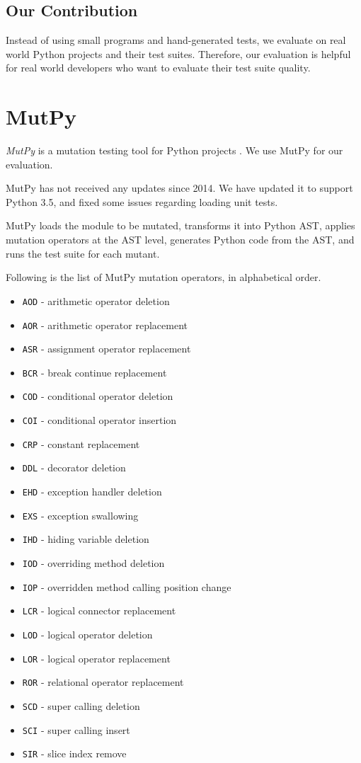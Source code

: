 \documentclass[12pt]{article}
\begin{document}
\subsection{Our Contribution}

Instead of using small programs and hand-generated tests, we evaluate on real world Python projects and their test suites. Therefore, our evaluation is helpful for real world developers who want to evaluate their test suite quality.

\section{MutPy}

\emph{MutPy} is a mutation testing tool for Python projects \cite{mutpy}. We use MutPy for our evaluation.

MutPy has not received any updates since 2014. We have updated it to support Python 3.5, and fixed some issues regarding loading unit tests.

MutPy loads the module to be mutated, transforms it into Python AST, applies mutation operators at the AST level, generates Python code from the AST, and runs the test suite for each mutant.

Following is the list of MutPy mutation operators, in alphabetical order.

\begin{itemize}
  \itemsep0em 
  \item \texttt{AOD} - arithmetic operator deletion
  \item \texttt{AOR} - arithmetic operator replacement
  \item \texttt{ASR} - assignment operator replacement
  \item \texttt{BCR} - break continue replacement
  \item \texttt{COD} - conditional operator deletion
  \item \texttt{COI} - conditional operator insertion
  \item \texttt{CRP} - constant replacement
  \item \texttt{DDL} - decorator deletion
  \item \texttt{EHD} - exception handler deletion
  \item \texttt{EXS} - exception swallowing
  \item \texttt{IHD} - hiding variable deletion
  \item \texttt{IOD} - overriding method deletion
  \item \texttt{IOP} - overridden method calling position change
  \item \texttt{LCR} - logical connector replacement
  \item \texttt{LOD} - logical operator deletion
  \item \texttt{LOR} - logical operator replacement
  \item \texttt{ROR} - relational operator replacement
  \item \texttt{SCD} - super calling deletion
  \item \texttt{SCI} - super calling insert
  \item \texttt{SIR} - slice index remove
\end{itemize}
\end{document}
